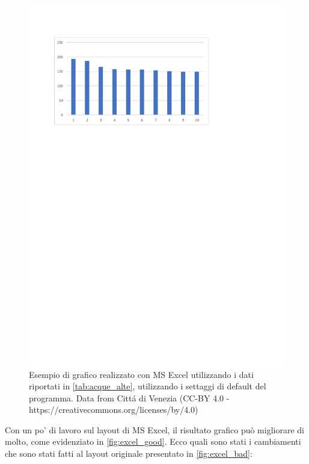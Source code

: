 \documentclass[9pt,a4paper,twoside]{rho-class/rho}
\begin{document}
\begin{figure}[h!]
    \centering
    \includegraphics[width=0.9\linewidth]{figures/graph_original.pdf}
    \caption{Esempio di grafico realizzato con MS Excel utilizzando i dati riportati in \autoref{tab:acque_alte}, utilizzando i settaggi di default del programma. Data from Cittá di Venezia (CC-BY 4.0 - https://creativecommons.org/licenses/by/4.0)}
    \label{fig:excel_bad}
\end{figure}

Con un po' di lavoro sul layout di MS Excel, il risultato grafico può migliorare di molto, come evidenziato in \autoref{fig:excel_good}. Ecco quali sono stati i cambiamenti che sono stati fatti al layout originale presentato in \autoref{fig:excel_bad}:
\end{document}

